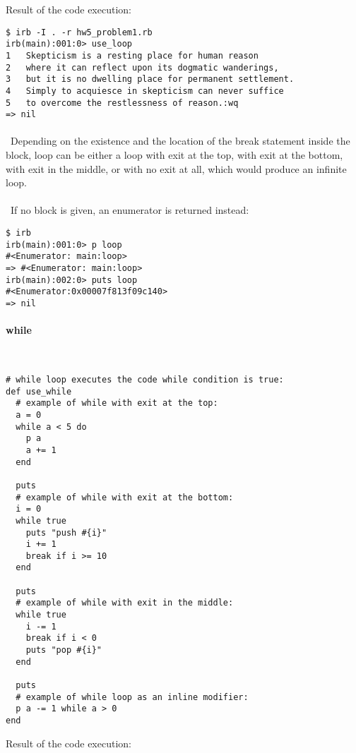 \documentclass{article}
\begin{document}
Result of the code execution:

\begin{verbatim} 
$ irb -I . -r hw5_problem1.rb
irb(main):001:0> use_loop
1	Skepticism is a resting place for human reason
2	where it can reflect upon its dogmatic wanderings,
3	but it is no dwelling place for permanent settlement.
4	Simply to acquiesce in skepticism can never suffice
5	to overcome the restlessness of reason.:wq
=> nil
\end{verbatim}

\paragraph{}\
Depending on the existence and the location of the break statement inside the block, loop can be either a loop with exit at the top, with exit at the bottom, with exit in the middle, or with no exit at all, which would produce an infinite loop. 
\paragraph{}\
If no block is given, an enumerator is returned instead:
\begin{verbatim} 
$ irb
irb(main):001:0> p loop
#<Enumerator: main:loop>
=> #<Enumerator: main:loop>
irb(main):002:0> puts loop
#<Enumerator:0x00007f813f09c140>
=> nil
\end{verbatim}

\paragraph{ while}\

\begin{verbatim}
# while loop executes the code while condition is true:
def use_while
  # example of while with exit at the top:
  a = 0
  while a < 5 do
    p a
    a += 1
  end

  puts
  # example of while with exit at the bottom:
  i = 0
  while true
    puts "push #{i}"
    i += 1
    break if i >= 10
  end

  puts
  # example of while with exit in the middle:
  while true
    i -= 1
    break if i < 0
    puts "pop #{i}"
  end
  
  puts
  # example of while loop as an inline modifier:
  p a -= 1 while a > 0
end
\end{verbatim}

Result of the code execution:
\end{document}

